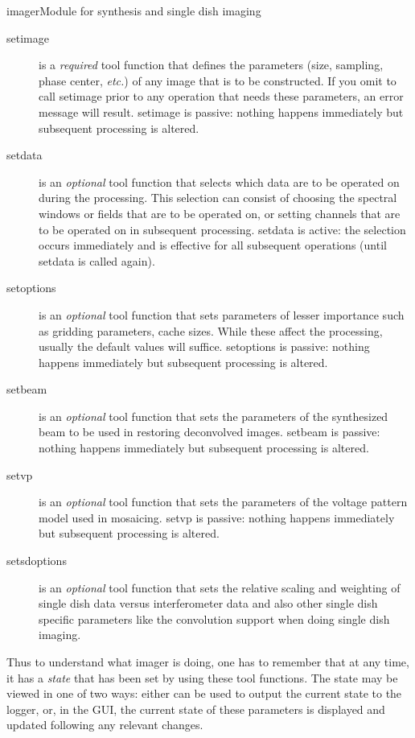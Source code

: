 \begin{ahmodule}{imager}{Module for synthesis and single dish imaging}
\begin{description}
\item[setimage] is a {\em required} tool function that defines
the parameters (size, sampling, phase center, {\em etc.}) of
any image that is to be constructed. If you omit to call
setimage prior to any operation that needs these parameters,
an error message will result. setimage is passive: nothing 
happens immediately but subsequent processing is altered.
\item[setdata] is an {\em optional} tool function that selects which data
are to be operated on during the processing. This selection can
consist of choosing the spectral windows or fields that are
to be operated on, or setting channels that are to be operated
on in subsequent processing. setdata is active: the selection
occurs immediately and is effective for all subsequent operations
(until setdata is called again).
\item[setoptions] is an {\em optional} tool function that sets parameters
of lesser importance such as gridding parameters, cache sizes. While
these affect the processing, usually the default values will
suffice. setoptions is passive: nothing happens immediately but
subsequent processing is altered.
\item[setbeam] is an {\em optional} tool function that sets the
parameters of the synthesized beam to be used in restoring deconvolved
images. setbeam is passive: nothing happens immediately but
subsequent processing is altered.
\item[setvp] is an {\em optional} tool function that sets the
parameters of the voltage pattern model used in mosaicing.
setvp is passive: nothing happens immediately but
subsequent processing is altered.
\item[setsdoptions] is an {\em optional} tool function that sets the
relative scaling and weighting of single dish data versus 
interferometer data and also other single dish specific parameters like the convolution support when doing single dish imaging.
\end{description}

Thus to understand what imager is doing, one has to remember that at
any time, it has a {\em state} that has been set by using these
tool functions. The state may be viewed in one of two ways: either 
 can be used to output the
current state to the logger, or, in the GUI, the current
state of these parameters is displayed and updated following any
relevant changes. 


\end{ahmodule}
